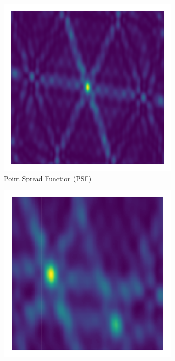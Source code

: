 \begin{figure}[h!]
	\centering
	\begin{subfigure}[b]{0.3\linewidth}
		\includegraphics[width=\linewidth, trim={18px 19px 18px 18px}, clip]{./chapters/01.intro/img/psf.png}
		\caption{Point Spread Function (PSF)}
	\end{subfigure}
	\begin{subfigure}[b]{0.3\linewidth}
		\includegraphics[width=\linewidth, trim={18px 19px 18px 18px}, clip]{./chapters/01.intro/img/dirty_image.png}

\end{subfigure}
\end{figure}
